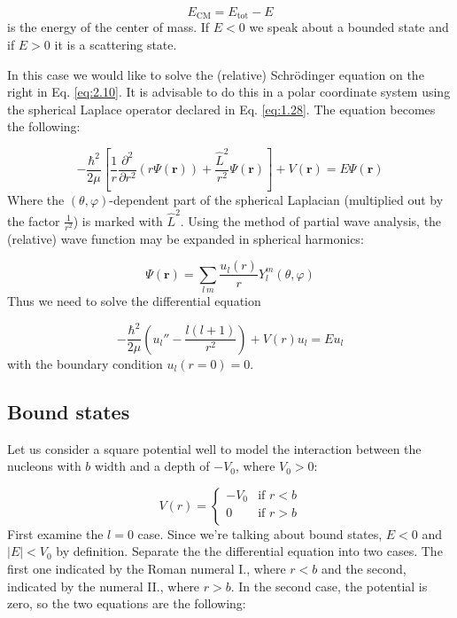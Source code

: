 \begin{equation} \label{eq:2.11}
	E_{\text{CM}} = E_{\text{tot}} - E
\end{equation}
is the energy of the center of mass. If $E < 0$ we speak about a bounded state and if $E > 0$ it is a scattering state. \par
In this case we would like to solve the (relative) Schrödinger equation on the right in Eq. \eqref{eq:2.10}. It is advisable to do this in a polar coordinate system using the spherical Laplace operator declared in Eq. \eqref{eq:1.28}. The equation becomes the following:

\begin{equation} \label{eq:2.12}
	- \frac{\hbar^{2}}{2 \mu}
	\left[
		\frac{1}{r} \frac{\partial^{2}}{\partial r^{2}} \left( r \Psi \left( \boldsymbol{r} \right) \right)
		+
		\frac{\hat{L}^{2}}{r^{2}} \Psi \left( \boldsymbol{r} \right)
	\right]
	+
	V \left( \boldsymbol{r} \right)
	=
	E \Psi \left( \boldsymbol{r} \right)
\end{equation}
Where the $(\theta, \varphi)$-dependent part of the spherical Laplacian (multiplied out by the factor $\frac{1}{r^{2}}$) is marked with $\hat{L}^{2}$. Using the method of partial wave analysis, the (relative) wave function may be expanded in spherical harmonics:

\begin{equation} \label{eq:2.13}
	\Psi \left( \boldsymbol{r} \right)
	=
	\sum_{l\,m} \frac{u_{l} \left( r \right)}{r} Y_{l}^{m} \left( \theta, \varphi \right)
\end{equation}
Thus we need to solve the differential equation

\begin{equation} \label{eq:2.14}
	- \frac{\hbar^{2}}{2 \mu}
	\left(
		u_{l}''
		-
		\frac{l \left( l + 1 \right)}{r^{2}}
	\right)
	+
	V \left( r \right) u_{l}
	=
	E u_{l}
\end{equation}
with the boundary condition $u_{l} \left( r = 0 \right) = 0$.

\subsection{Bound states}
Let us consider a square potential well to model the interaction between the nucleons with $b$ width and a depth of $- V_{0}$, where $V_{0} > 0$:

\begin{equation} \label{eq:2.15}
	V \left( r \right)
	=
	\begin{cases}
		- V_{0} & \text{if } r < b \\
		0       & \text{if } r > b \\
	\end{cases}
\end{equation}
First examine the $l = 0$ case. Since we're talking about bound states, $E < 0$ and $\left| E \right| < V_{0}$ by definition. Separate the the differential equation into two cases. The first one indicated by the Roman numeral I., where $r < b$ and the second, indicated by the numeral II., where $r > b$. In the second case, the potential is zero, so the two equations are the following:

